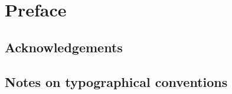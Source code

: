 
\chapter{Preface}

\section*{Acknowledgements}

% 

\section*{Notes on typographical conventions}

